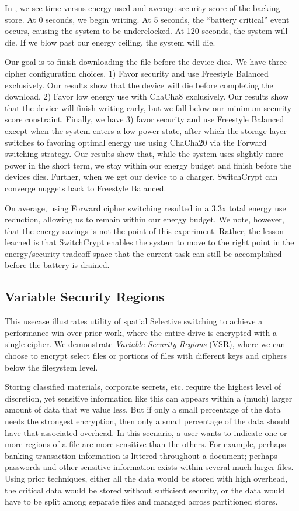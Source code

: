 In , we see time versus energy used and average security
score of the backing store. At 0 seconds, we begin writing. At 5 seconds, the
``battery critical'' event occurs, causing the system to be underclocked. At 120
seconds, the system will die. If we blow past our energy ceiling, the system
will die.

Our goal is to finish downloading the file before the device dies. We have three
cipher configuration choices. 1) Favor security and use Freestyle Balanced
exclusively. Our results show that the device will die before completing the
download. 2) Favor low energy use with ChaCha8 exclusively. Our results show
that the device will finish writing early, but we fall below our minimum
security score constraint. Finally, we have 3) favor security and use Freestyle
Balanced except when the system enters a low power state, after which the
storage layer switches to favoring optimal energy use using ChaCha20 via the
Forward switching strategy. Our results show that, while the system uses
slightly more power in the short term, we stay within our energy budget and
finish before the devices dies. Further, when we get our device to a charger,
SwitchCrypt can converge nuggets back to Freestyle Balanced.

On average, using Forward cipher switching resulted in a 3.3x total energy use
reduction, allowing us to remain within our energy budget. We note, however,
that the energy savings is not the point of this experiment. Rather, the lesson
learned is that SwitchCrypt enables the system to move to the right point in the
energy/security tradeoff space that the current task can still be accomplished
before the battery is drained.

\subsection{Variable Security Regions} \label{subsec:uc2}

This usecase illustrates utility of spatial Selective switching to achieve a
performance win over prior work, where the entire drive is encrypted with a
single cipher. We demonstrate \emph{Variable Security Regions} (VSR), where we
can choose to encrypt select files or portions of files with different keys and
ciphers below the filesystem level.

Storing classified materials, corporate secrets, etc. require the highest level
of discretion, yet sensitive information like this can appears within a (much)
larger amount of data that we value less. But if only a small percentage of the
data needs the strongest encryption, then only a small percentage of the data
should have that associated overhead. In this scenario, a user wants to indicate
one or more regions of a file are more sensitive than the others. For example,
perhaps banking transaction information is littered throughout a document;
perhaps passwords and other sensitive information exists within several much
larger files. Using prior techniques, either all the data would be stored with
high overhead, the critical data would be stored without sufficient security, or
the data would have to be split among separate files and managed across
partitioned stores.

